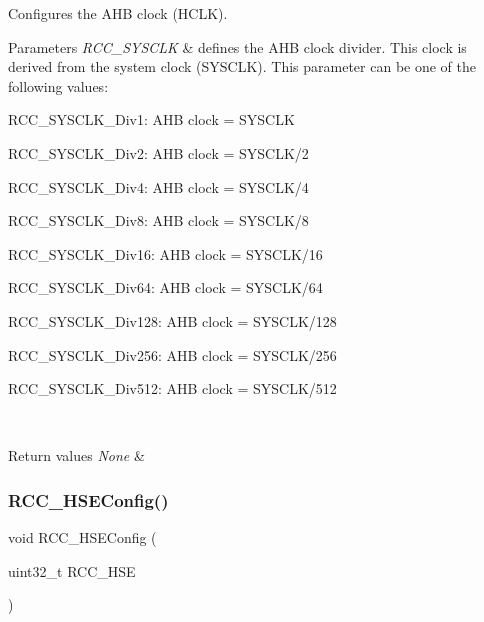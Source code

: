 Configures the A\+HB clock (H\+C\+LK). 


\begin{DoxyParams}{Parameters}
{\em R\+C\+C\+\_\+\+S\+Y\+S\+C\+LK} & defines the A\+HB clock divider. This clock is derived from the system clock (S\+Y\+S\+C\+LK). This parameter can be one of the following values\+: \begin{DoxyItemize}
\item R\+C\+C\+\_\+\+S\+Y\+S\+C\+L\+K\+\_\+\+Div1\+: A\+HB clock = S\+Y\+S\+C\+LK \item R\+C\+C\+\_\+\+S\+Y\+S\+C\+L\+K\+\_\+\+Div2\+: A\+HB clock = S\+Y\+S\+C\+L\+K/2 \item R\+C\+C\+\_\+\+S\+Y\+S\+C\+L\+K\+\_\+\+Div4\+: A\+HB clock = S\+Y\+S\+C\+L\+K/4 \item R\+C\+C\+\_\+\+S\+Y\+S\+C\+L\+K\+\_\+\+Div8\+: A\+HB clock = S\+Y\+S\+C\+L\+K/8 \item R\+C\+C\+\_\+\+S\+Y\+S\+C\+L\+K\+\_\+\+Div16\+: A\+HB clock = S\+Y\+S\+C\+L\+K/16 \item R\+C\+C\+\_\+\+S\+Y\+S\+C\+L\+K\+\_\+\+Div64\+: A\+HB clock = S\+Y\+S\+C\+L\+K/64 \item R\+C\+C\+\_\+\+S\+Y\+S\+C\+L\+K\+\_\+\+Div128\+: A\+HB clock = S\+Y\+S\+C\+L\+K/128 \item R\+C\+C\+\_\+\+S\+Y\+S\+C\+L\+K\+\_\+\+Div256\+: A\+HB clock = S\+Y\+S\+C\+L\+K/256 \item R\+C\+C\+\_\+\+S\+Y\+S\+C\+L\+K\+\_\+\+Div512\+: A\+HB clock = S\+Y\+S\+C\+L\+K/512 \end{DoxyItemize}
\\
\hline
\end{DoxyParams}

\begin{DoxyRetVals}{Return values}
{\em None} & \\
\hline
\end{DoxyRetVals}
\mbox{\label{group___r_c_c___private___functions_ga432b3281546d23345642d55f8670a93d}} 
\subsubsection{\texorpdfstring{RCC\_HSEConfig()}{RCC\_HSEConfig()}}
{\footnotesize\ttfamily void R\+C\+C\+\_\+\+H\+S\+E\+Config (\begin{DoxyParamCaption}\item[{uint32\+\_\+t}]{R\+C\+C\+\_\+\+H\+SE }\end{DoxyParamCaption})}



